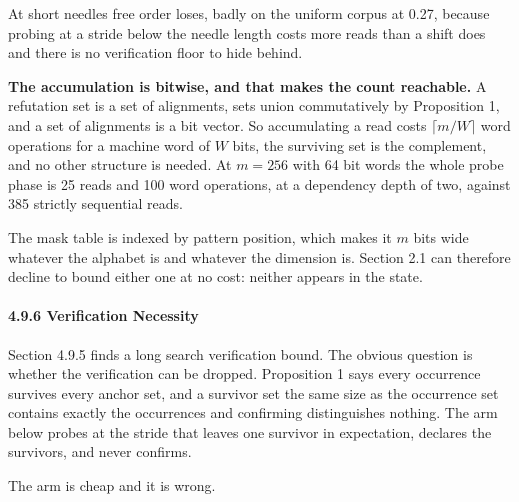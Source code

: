 At short needles free order loses, badly on the uniform corpus at 0.27, because probing at a stride below the needle length costs more reads than a shift does and there is no verification floor to hide behind.

\textbf{The accumulation is bitwise, and that makes the count reachable.} A refutation set is a set of alignments, sets union commutatively by Proposition 1, and a set of alignments is a bit vector. So accumulating a read costs \(\lceil m/W \rceil\) word operations for a machine word of \(W\) bits, the surviving set is the complement, and no other structure is needed. At \(m = 256\) with 64 bit words the whole probe phase is 25 reads and 100 word operations, at a dependency depth of two, against 385 strictly sequential reads.

The mask table is indexed by pattern position, which makes it \(m\) bits wide whatever the alphabet is and whatever the dimension is. Section 2.1 can therefore decline to bound either one at no cost: neither appears in the state.

\paragraph{4.9.6 Verification Necessity}

Section 4.9.5 finds a long search verification bound. The obvious question is whether the verification can be dropped. Proposition 1 says every occurrence survives every anchor set, and a survivor set the same size as the occurrence set contains exactly the occurrences and confirming distinguishes nothing. The arm below probes at the stride that leaves one survivor in expectation, declares the survivors, and never confirms.

The arm is cheap and it is wrong.

